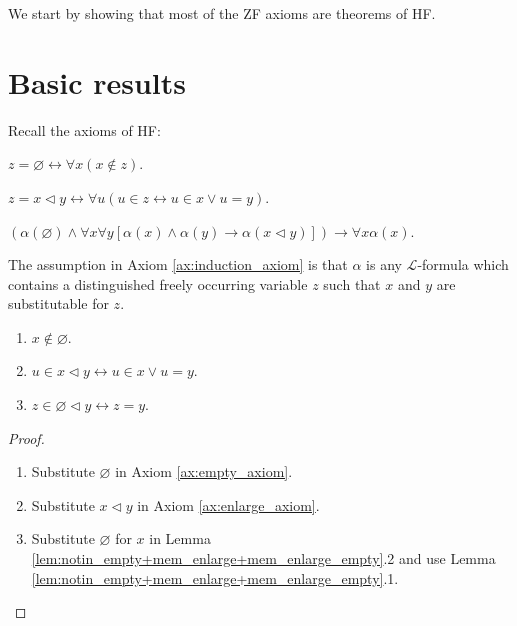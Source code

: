 We start by showing that most of the ZF axioms are theorems of HF.

\section{Basic results}

Recall the axioms of HF:

\begin{axiom}
    \label{ax:empty_axiom}
    \leanok
    $z=\varnothing \leftrightarrow \forall x(x \notin z)$.
\end {axiom}

\begin{axiom}
    \label{ax:enlarge_axiom}
    \leanok
    $z=x \lhd y \leftrightarrow \forall u(u \in z \leftrightarrow u \in x \lor u=y)$.
\end {axiom}

\begin{axiom}
    \label{ax:induction_axiom}
    \leanok
    $(\alpha(\varnothing) \land \forall x \forall y[\alpha(x) \land \alpha(y) \rightarrow 
    \alpha(x \lhd y)]) \rightarrow \forall x \alpha(x)$. 
\end {axiom}

The assumption in Axiom \ref{ax:induction_axiom} is that 
$\alpha$ is any $\mathcal{L}$-formula which contains a 
distinguished freely occurring variable $z$ such that $x$ and $y$ are substitutable for $z$.

\begin{lemma}
    \label{lem:notin_empty+mem_enlarge+mem_enlarge_empty}
    \leanok
    \leavevmode
    \begin{enumerate}
        \item $x\notin \varnothing$.
        \item $u \in x \lhd y \leftrightarrow u \in x \lor u=y$.
        \item $z\in \varnothing \lhd y \leftrightarrow z = y$.
    \end{enumerate}
\end{lemma}

\begin{proof}
    \leanok
    \leavevmode
    \begin{enumerate}
        \item Substitute $\varnothing$ in Axiom \ref{ax:empty_axiom}.
        \item Substitute $x \lhd y$ in Axiom \ref{ax:enlarge_axiom}.
        \item Substitute $\varnothing$ for $x$ in Lemma 
        \ref{lem:notin_empty+mem_enlarge+mem_enlarge_empty}.2 and use Lemma 
        \ref{lem:notin_empty+mem_enlarge+mem_enlarge_empty}.1.
    \end{enumerate}
\end{proof}

